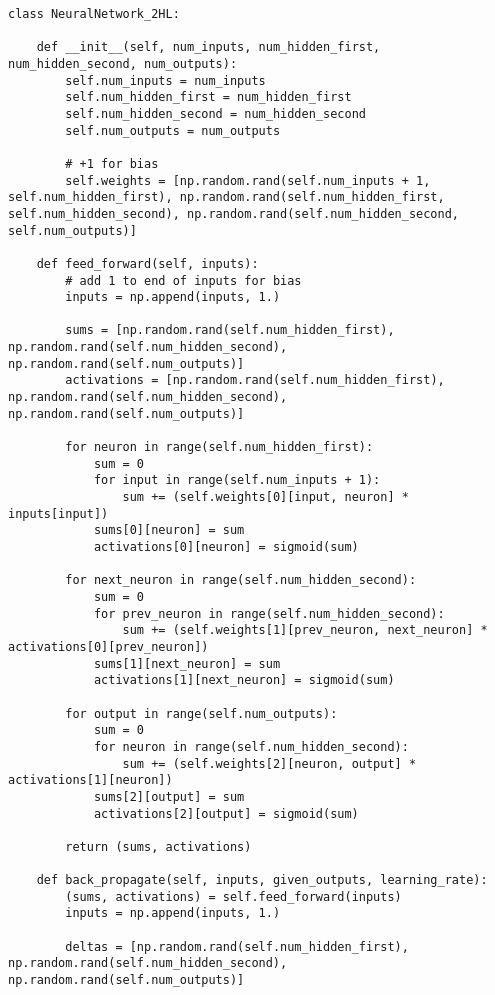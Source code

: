 \documentclass[11pt]{article} %
\begin{document}
\begin{lstlisting}
class NeuralNetwork_2HL:
    
    def __init__(self, num_inputs, num_hidden_first, num_hidden_second, num_outputs):
        self.num_inputs = num_inputs
        self.num_hidden_first = num_hidden_first
        self.num_hidden_second = num_hidden_second
        self.num_outputs = num_outputs
        
        # +1 for bias
        self.weights = [np.random.rand(self.num_inputs + 1, self.num_hidden_first), np.random.rand(self.num_hidden_first, self.num_hidden_second), np.random.rand(self.num_hidden_second, self.num_outputs)]
        
    def feed_forward(self, inputs):
        # add 1 to end of inputs for bias
        inputs = np.append(inputs, 1.)
        
        sums = [np.random.rand(self.num_hidden_first), np.random.rand(self.num_hidden_second), np.random.rand(self.num_outputs)]
        activations = [np.random.rand(self.num_hidden_first), np.random.rand(self.num_hidden_second), np.random.rand(self.num_outputs)]
        
        for neuron in range(self.num_hidden_first):
            sum = 0
            for input in range(self.num_inputs + 1):
                sum += (self.weights[0][input, neuron] * inputs[input])
            sums[0][neuron] = sum
            activations[0][neuron] = sigmoid(sum)
            
        for next_neuron in range(self.num_hidden_second):
            sum = 0
            for prev_neuron in range(self.num_hidden_second):
                sum += (self.weights[1][prev_neuron, next_neuron] * activations[0][prev_neuron])
            sums[1][next_neuron] = sum
            activations[1][next_neuron] = sigmoid(sum)
            
        for output in range(self.num_outputs):
            sum = 0
            for neuron in range(self.num_hidden_second):
                sum += (self.weights[2][neuron, output] * activations[1][neuron])
            sums[2][output] = sum
            activations[2][output] = sigmoid(sum)
            
        return (sums, activations)
        
    def back_propagate(self, inputs, given_outputs, learning_rate):
        (sums, activations) = self.feed_forward(inputs)
        inputs = np.append(inputs, 1.)
        
        deltas = [np.random.rand(self.num_hidden_first), np.random.rand(self.num_hidden_second), np.random.rand(self.num_outputs)]
        

\end{lstlisting}
\end{document}
